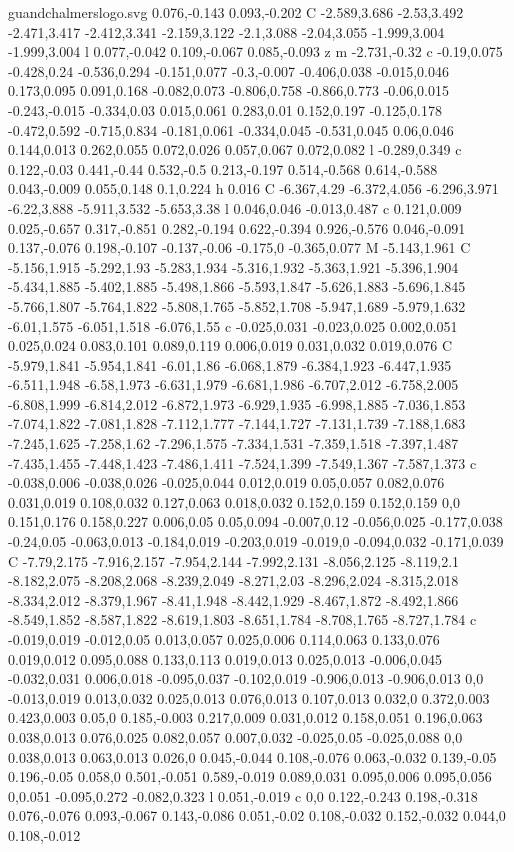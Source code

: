 \begin{filecontents}[noheader]{guandchalmerslogo.svg}
0.076,-0.143 0.093,-0.202 C -2.589,3.686 -2.53,3.492 -2.471,3.417 -2.412,3.341 -2.159,3.122 -2.1,3.088 -2.04,3.055 -1.999,3.004 -1.999,3.004 l 0.077,-0.042 0.109,-0.067 0.085,-0.093 z m -2.731,-0.32 c -0.19,0.075 -0.428,0.24 -0.536,0.294 -0.151,0.077 -0.3,-0.007 -0.406,0.038 -0.015,0.046 0.173,0.095 0.091,0.168 -0.082,0.073 -0.806,0.758 -0.866,0.773 -0.06,0.015 -0.243,-0.015 -0.334,0.03 0.015,0.061 0.283,0.01 0.152,0.197 -0.125,0.178 -0.472,0.592 -0.715,0.834 -0.181,0.061 -0.334,0.045 -0.531,0.045 0.06,0.046 0.144,0.013 0.262,0.055 0.072,0.026 0.057,0.067 0.072,0.082 l -0.289,0.349 c 0.122,-0.03 0.441,-0.44 0.532,-0.5 0.213,-0.197 0.514,-0.568 0.614,-0.588 0.043,-0.009 0.055,0.148 0.1,0.224 h 0.016 C -6.367,4.29 -6.372,4.056 -6.296,3.971 -6.22,3.888 -5.911,3.532 -5.653,3.38 l 0.046,0.046 -0.013,0.487 c 0.121,0.009 0.025,-0.657 0.317,-0.851 0.282,-0.194 0.622,-0.394 0.926,-0.576 0.046,-0.091 0.137,-0.076 0.198,-0.107 -0.137,-0.06 -0.175,0 -0.365,0.077 M -5.143,1.961 C -5.156,1.915 -5.292,1.93 -5.283,1.934 -5.316,1.932 -5.363,1.921 -5.396,1.904 -5.434,1.885 -5.402,1.885 -5.498,1.866 -5.593,1.847 -5.626,1.883 -5.696,1.845 -5.766,1.807 -5.764,1.822 -5.808,1.765 -5.852,1.708 -5.947,1.689 -5.979,1.632 -6.01,1.575 -6.051,1.518 -6.076,1.55 c -0.025,0.031 -0.023,0.025 0.002,0.051 0.025,0.024 0.083,0.101 0.089,0.119 0.006,0.019 0.031,0.032 0.019,0.076 C -5.979,1.841 -5.954,1.841 -6.01,1.86 -6.068,1.879 -6.384,1.923 -6.447,1.935 -6.511,1.948 -6.58,1.973 -6.631,1.979 -6.681,1.986 -6.707,2.012 -6.758,2.005 -6.808,1.999 -6.814,2.012 -6.872,1.973 -6.929,1.935 -6.998,1.885 -7.036,1.853 -7.074,1.822 -7.081,1.828 -7.112,1.777 -7.144,1.727 -7.131,1.739 -7.188,1.683 -7.245,1.625 -7.258,1.62 -7.296,1.575 -7.334,1.531 -7.359,1.518 -7.397,1.487 -7.435,1.455 -7.448,1.423 -7.486,1.411 -7.524,1.399 -7.549,1.367 -7.587,1.373 c -0.038,0.006 -0.038,0.026 -0.025,0.044 0.012,0.019 0.05,0.057 0.082,0.076 0.031,0.019 0.108,0.032 0.127,0.063 0.018,0.032 0.152,0.159 0.152,0.159 0,0 0.151,0.176 0.158,0.227 0.006,0.05 0.05,0.094 -0.007,0.12 -0.056,0.025 -0.177,0.038 -0.24,0.05 -0.063,0.013 -0.184,0.019 -0.203,0.019 -0.019,0 -0.094,0.032 -0.171,0.039 C -7.79,2.175 -7.916,2.157 -7.954,2.144 -7.992,2.131 -8.056,2.125 -8.119,2.1 -8.182,2.075 -8.208,2.068 -8.239,2.049 -8.271,2.03 -8.296,2.024 -8.315,2.018 -8.334,2.012 -8.379,1.967 -8.41,1.948 -8.442,1.929 -8.467,1.872 -8.492,1.866 -8.549,1.852 -8.587,1.822 -8.619,1.803 -8.651,1.784 -8.708,1.765 -8.727,1.784 c -0.019,0.019 -0.012,0.05 0.013,0.057 0.025,0.006 0.114,0.063 0.133,0.076 0.019,0.012 0.095,0.088 0.133,0.113 0.019,0.013 0.025,0.013 -0.006,0.045 -0.032,0.031 0.006,0.018 -0.095,0.037 -0.102,0.019 -0.906,0.013 -0.906,0.013 0,0 -0.013,0.019 0.013,0.032 0.025,0.013 0.076,0.013 0.107,0.013 0.032,0 0.372,0.003 0.423,0.003 0.05,0 0.185,-0.003 0.217,0.009 0.031,0.012 0.158,0.051 0.196,0.063 0.038,0.013 0.076,0.025 0.082,0.057 0.007,0.032 -0.025,0.05 -0.025,0.088 0,0 0.038,0.013 0.063,0.013 0.026,0 0.045,-0.044 0.108,-0.076 0.063,-0.032 0.139,-0.05 0.196,-0.05 0.058,0 0.501,-0.051 0.589,-0.019 0.089,0.031 0.095,0.006 0.095,0.056 0,0.051 -0.095,0.272 -0.082,0.323 l 0.051,-0.019 c 0,0 0.122,-0.243 0.198,-0.318 0.076,-0.076 0.093,-0.067 0.143,-0.086 0.051,-0.02 0.108,-0.032 0.152,-0.032 0.044,0 0.108,-0.012 
\end{filecontents}
